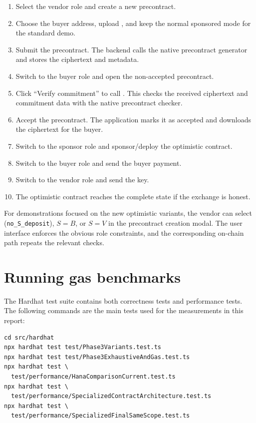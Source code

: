\begin{enumerate}
  \item Select the vendor role and create a new precontract.
  \item Choose the buyer address, upload , and keep the
  normal sponsored mode for the standard demo.
  \item Submit the precontract. The backend calls the native precontract generator and
  stores the ciphertext and metadata.
  \item Switch to the buyer role and open the non-accepted precontract.
  \item Click ``Verify commitment'' to call . This checks
  the received ciphertext and commitment data with the native precontract checker.
  \item Accept the precontract. The application marks it as accepted and downloads the
  ciphertext for the buyer.
  \item Switch to the sponsor role and sponsor/deploy the optimistic contract.
  \item Switch to the buyer role and send the buyer payment.
  \item Switch to the vendor role and send the key.
  \item The optimistic contract reaches the complete state if the exchange is honest.
\end{enumerate}

For demonstrations focused on the new optimistic variants, the vendor can select
\simsox{} (\texttt{no\_S\_deposit}), \(S=B\), or \(S=V\) in the precontract creation modal.
The user interface enforces the obvious role constraints, and the corresponding on-chain
path repeats the relevant checks.

\section{Running gas benchmarks}

The Hardhat test suite contains both correctness tests and performance tests. The following
commands are the main tests used for the measurements in this report:

\begin{verbatim}
cd src/hardhat
npx hardhat test test/Phase3Variants.test.ts
npx hardhat test test/Phase3ExhaustiveAndGas.test.ts
npx hardhat test \
  test/performance/HanaComparisonCurrent.test.ts
npx hardhat test \
  test/performance/SpecializedContractArchitecture.test.ts
npx hardhat test \
  test/performance/SpecializedFinalSameScope.test.ts
\end{verbatim}

